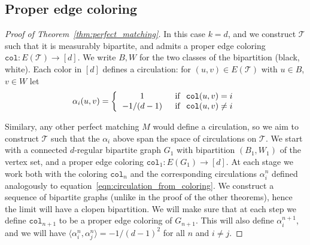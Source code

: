 \documentclass[10pt]{article}
\theoremstyle{plain}
\theoremstyle{remark}
\newcommand{\1}{\mathbbm{1}}
\newcommand{\mcT}{\mathcal{T}}
\numberwithin{equation}{section}
\begin{document}
\subsection{Proper edge coloring}
\label{subsec:edge_coloring}
\begin{proof}[Proof of Theorem~\ref{thm:perfect_matching}]

In this case $k=d$, and we construct $\mcT$ such that it is measurably bipartite, and admits a proper edge coloring $\texttt{col}:E( \mcT) \to [d]$. We write $B,W$ for the two classes of the bipartition (black, white). Each color in $[d]$ defines a circulation: for $(u,v)\in E(\mcT)$ with $u \in B$, $v \in W$ let 
\begin{equation} \label{eqn:circulation_from_coloring}
    \alpha_i(u,v)=
    \left\{
        \begin{tabular}{cc}
            $1$ & \textrm{ if } $\texttt{col}(u,v)=i$ \\
            $-1/(d-1)$ & \textrm{ if } $\texttt{col}(u,v) \neq i$  
        \end{tabular}
    \right. 
\end{equation}

Similary, any other perfect matching $M$ would define a circulation, so we aim to construct $\mcT$ such that the $\alpha_i$ above span the space of circulations on $\mcT$. We start with a connected $d$-regular bipartite graph $G_1$ with bipartition $(B_1, W_1)$ of the vertex set, and a proper edge coloring $\texttt{col}_1:E(G_1) \to [d]$. At each stage we work both with the coloring $\texttt{col}_n$ and the corresponding circulations $\alpha^n_i$ defined analogously to equation~\ref{eqn:circulation_from_coloring}. We construct a sequence of bipartite graphs (unlike in the proof of the other theorems), hence the limit will have a clopen bipartition. We will make sure that at each step we define $\texttt{col}_{n+1}$ to be a proper edge coloring of $G_{n+1}$. This will also define $\alpha^{n+1}_{i}$, and we will have $\langle \alpha_i^{n}, \alpha_j^{n} \rangle = -1/(d-1)^2$ for all $n$ and $i \neq j$.


\end{proof}
\end{document}
